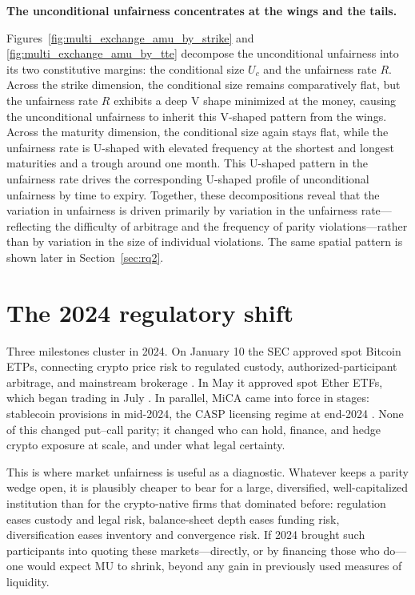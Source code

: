 \documentclass[12pt]{article}
\newcommand{\lead}[1]{\par\smallskip\noindent\textbf{#1}\par\nobreak\noindent}
\begin{document}
\lead{The unconditional unfairness concentrates at the wings and the tails.} Figures~\ref{fig:multi_exchange_amu_by_strike} and \ref{fig:multi_exchange_amu_by_tte} decompose the unconditional unfairness into its two constitutive margins: the conditional size $U_c$ and the unfairness rate $R$. Across the strike dimension, the conditional size remains comparatively flat, but the unfairness rate $R$ exhibits a deep V shape minimized at the money, causing the unconditional unfairness to inherit this V-shaped pattern from the wings. Across the maturity dimension, the conditional size again stays flat, while the unfairness rate is U-shaped with elevated frequency at the shortest and longest maturities and a trough around one month. This U-shaped pattern in the unfairness rate drives the corresponding U-shaped profile of unconditional unfairness by time to expiry. Together, these decompositions reveal that the variation in unfairness is driven primarily by variation in the unfairness rate---reflecting the difficulty of arbitrage and the frequency of parity violations---rather than by variation in the size of individual violations. The same spatial pattern is shown later in Section~\ref{sec:rq2}.

\clearpage
\section{The 2024 regulatory shift}
\label{sec:regulation}

Three milestones cluster in 2024. On January 10 the SEC approved spot Bitcoin ETPs, connecting crypto price risk to regulated custody, authorized-participant arbitrage, and mainstream brokerage \citep{sec_spot_bitcoin_etp_2024}. In May it approved spot Ether ETFs, which began trading in July \citep{sec_spot_ether_etp_2024}. In parallel, MiCA came into force in stages: stablecoin provisions in mid-2024, the CASP licensing regime at end-2024 \citep{esma_mica_2024}. None of this changed put--call parity; it changed who can hold, finance, and hedge crypto exposure at scale, and under what legal certainty.

This is where market unfairness is useful as a diagnostic. Whatever keeps a parity wedge open, it is plausibly cheaper to bear for a large, diversified, well-capitalized institution than for the crypto-native firms that dominated before: regulation eases custody and legal risk, balance-sheet depth eases funding risk, diversification eases inventory and convergence risk. If 2024 brought such participants into quoting these markets---directly, or by financing those who do---one would expect MU to shrink, beyond any gain in previously used measures of liquidity. 
\end{document}
